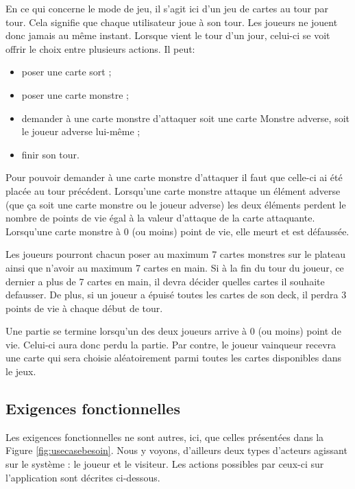 \documentclass[11pt,a4paper]{article}
\begin{document}
\medbreak

En ce qui concerne le mode de jeu, il s'agit ici d'un jeu de cartes au tour par tour.  Cela signifie que chaque utilisateur joue à son tour.  Les joueurs ne jouent donc jamais au même instant.  Lorsque vient le tour d'un jour, celui-ci se voit offrir le choix entre plusieurs actions. Il peut:

\begin{itemize}
 \item[\textbullet] poser une carte sort ;
 \item[\textbullet] poser une carte monstre ;
 \item[\textbullet] demander à une carte monstre d'attaquer soit une carte Monstre adverse, soit le joueur adverse lui-même ;
 \item[\textbullet] finir son tour.
\end{itemize}

Pour pouvoir demander à une carte monstre d'attaquer il faut que celle-ci ai été placée au tour précédent.  Lorsqu'une carte monstre attaque un élément adverse (que ça soit une carte monstre ou le joueur adverse) les deux éléments perdent le nombre de points de vie égal à la valeur d'attaque de la carte attaquante.  Lorsqu'une carte monstre à 0 (ou moins) point de vie, elle meurt et est défaussée.

\medbreak


Les joueurs pourront chacun poser au maximum 7 cartes monstres sur le plateau ainsi que n'avoir au maximum 7 cartes en main. Si à la fin du tour du joueur, ce dernier a plus de 7 cartes en main, il devra décider quelles cartes il souhaite \gls{defausser}. De plus, si un joueur a épuisé toutes les cartes de son deck, il perdra 3 points de vie à chaque début de tour.

\medbreak

Une partie se termine lorsqu'un des deux joueurs arrive à 0 (ou moins) point de vie.  Celui-ci aura donc perdu la partie.  Par contre, le joueur vainqueur recevra une carte qui sera choisie aléatoirement parmi toutes les cartes disponibles dans le jeux.


\subsection{Exigences fonctionnelles}

Les exigences fonctionnelles ne sont autres, ici, que celles présentées dans la Figure \ref{fig:usecasebesoin}. Nous y voyons, d'ailleurs deux types d'acteurs agissant sur le système : le joueur et le visiteur. Les actions possibles par ceux-ci sur l'application sont décrites ci-dessous.
\end{document}
